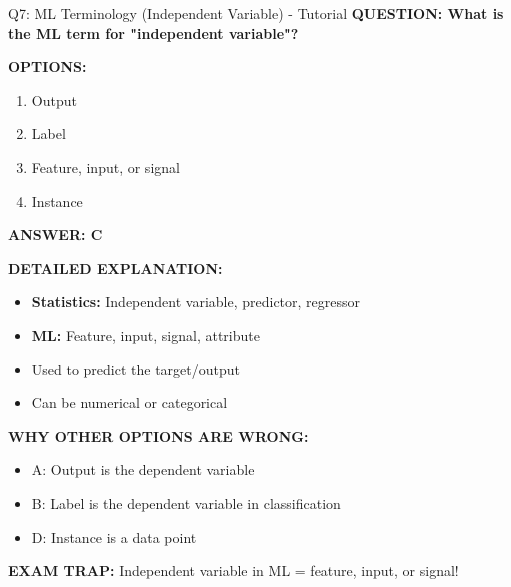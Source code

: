 \documentclass[8pt]{beamer}
\begin{document}
	\begin{frame}{Q7: ML Terminology (Independent Variable) - Tutorial}
		\fontsize{6.5}{7.5}\selectfont
		\textbf{QUESTION: What is the ML term for "independent variable"?}
		
		\vspace{0.1cm}
		\textbf{OPTIONS:}
		\begin{enumerate}
			\item Output
			\item Label
			\item Feature, input, or signal
			\item Instance
		\end{enumerate}
		
		\vspace{0.1cm}
		\textcolor{myblue}{\textbf{ANSWER: C}}
		
		\vspace{0.1cm}
		\textbf{DETAILED EXPLANATION:}
		\begin{itemize}
			\item \textbf{Statistics:} Independent variable, predictor, regressor
			\item \textbf{ML:} Feature, input, signal, attribute
			\item Used to predict the target/output
			\item Can be numerical or categorical
		\end{itemize}
		
		\vspace{0.1cm}
		\textcolor{myred}{\textbf{WHY OTHER OPTIONS ARE WRONG:}}
		\begin{itemize}
			\item \textcolor{myred}{A:} Output is the dependent variable
			\item \textcolor{myred}{B:} Label is the dependent variable in classification
			\item \textcolor{myred}{D:} Instance is a data point
		\end{itemize}
		
		\textcolor{myred}{\textbf{EXAM TRAP:}} Independent variable in ML = \textcolor{myblue}{feature, input, or signal}!
	\end{frame}
	
\end{document}
